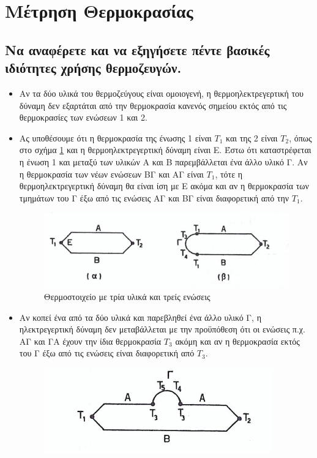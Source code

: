 \documentclass{article}
\begin{document}
\section{Μέτρηση Θερμοκρασίας}
\subsection{Να αναφέρετε και να εξηγήσετε πέντε βασικές ιδιότητες χρήσης θερμοζευγών.}
\begin{itemize}
    \item Αν τα δύο υλικά του θερμοζεύγους είναι ομοιογενή, η θερμοηλεκτρεγερτική του δύναμη δεν εξαρτάται από την θερμοκρασία κανενός σημείου εκτός από τις θερμοκρασίες των ενώσεων 1
        και 2.
    \item Ας υποθέσουμε ότι η θερμοκρασία της ένωσης 1 είναι $T_1$ και της 2 είναι $T_2$, όπως στο σχήμα \ref{fig:7.1thermo1} και η θερμοηλεκτρεγερτική δύναμη είναι Ε. 
        Έστω ότι καταστρέφεται η ένωση 1 και μεταξύ των υλικών Α και Β παρεμβάλλεται ένα άλλο υλικό Γ. Αν η θερμοκρασία των νέων ενώσεων ΒΓ και ΑΓ είναι $T_1$, τότε η 
        θερμοηλεκτρεγερτική δύναμη θα είναι ίση με Ε ακόμα και αν η θερμοκρασία των τμημάτων του Γ έξω από τις ενώσεις ΑΓ και ΒΓ είναι διαφορετική από την $T_1$.
        \begin{figure}[h!]
            \includegraphics[width=\linewidth]{thermozevgi1.png}
            \caption{Θερμοστοιχείο με τρία υλικά και τρείς ενώσεις}
            \label{fig:7.1thermo1}
        \end{figure}
    \item Αν κοπεί ένα από τα δύο υλικά και παρεβληθεί ένα άλλο υλικό Γ, η ηλεκτρεγερτική δύναμη δεν μεταβάλλεται με την προϋπόθεση ότι οι ενώσεις π.χ. ΑΓ και ΓΑ έχουν την ίδια 
        θερμοκρασία $T_3$ ακόμη και αν η θερμοκρασία εκτός του Γ έξω από τις ενώσεις είναι διαφορετική από $T_3$.
        \begin{figure}[h!]
            \includegraphics[width=\linewidth]{thermozevgi2.png}

\end{figure}
\end{itemize}
\end{document}
